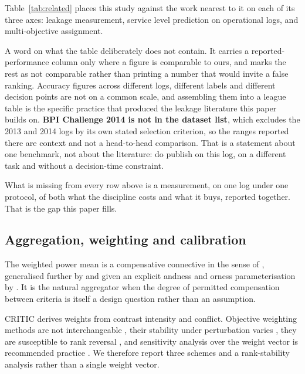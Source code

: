 Table~\ref{tab:related} places this study against the work nearest to it on each of its three
axes: leakage measurement, service level prediction on operational logs, and multi-objective
assignment.

A word on what the table deliberately does not contain. It carries a reported-performance column
only where a figure is comparable to ours, and marks the rest as not comparable rather than
printing a number that would invite a false ranking. Accuracy figures across different logs,
different labels and different decision points are not on a common scale, and assembling them
into a league table is the specific practice that produced the leakage literature this paper
builds on. \textbf{BPI Challenge 2014 is not in the \citet{teinemaa2019outcome} dataset list},
which excludes the 2013 and 2014 logs by its own stated selection criterion, so the ranges
reported there are context and not a head-to-head comparison. That is a statement about one
benchmark, not about the literature: \citet{dees2014predictive} do publish on this log, on a
different task and without a decision-time constraint.

\begin{table}[htbp]
\centering
\caption{This study against the closest prior work. A dash in the performance column means the
figure exists in the cited work but is not on a scale comparable with ours, because the task,
the log or the decision point differs.}
\label{tab:related}
\small


\end{table}

What is missing from every row above is a measurement, on one log under one protocol, of both
what the discipline costs and what it buys, reported together. That is the gap this paper fills.

\subsection{Aggregation, weighting and calibration}

The weighted power mean is a compensative connective in the sense of
\citet{dyckhoff1984generalized}, generalised further by \citet{aggarwal2015generalized} and
given an explicit andness and orness parameterisation by \citet{dujmovic2015weighted}. It is
the natural aggregator when the degree of permitted compensation between criteria is itself
a design question rather than an assumption.

CRITIC \citep{diakoulaki1995determining} derives weights from contrast intensity and
conflict. Objective weighting methods are not interchangeable
\citep{mukhametzyanov2021specific,ariyanti2025comparative}, their stability under
perturbation varies \citep{linh2025evaluating,paradowski2025novel}, they are susceptible to
rank reversal \citep{li2026trend}, and sensitivity analysis over the weight vector is
recommended practice \citep{gaona2025integrated}. We therefore report three schemes and a
rank-stability analysis rather than a single weight vector.

